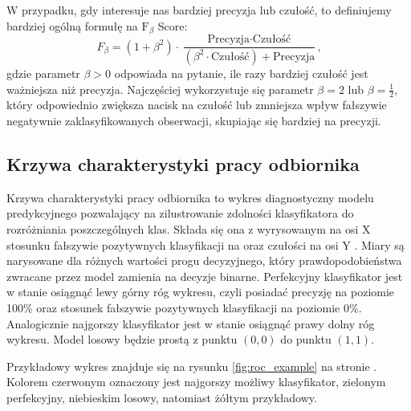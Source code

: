 \documentclass[inzynierska]{pwr_wmat_praca_dyplomowa}
\theoremstyle{plain}
\numberwithin{theorem}{chapter}
\theoremstyle{definition}
\numberwithin{theorem}{chapter}
\begin{document}
W przypadku, gdy interesuje nas bardziej precyzja lub czułość, to definiujemy bardziej ogólną formułę na $\text{F}_{\beta}$ Score:
$$ F_{\beta} = (1 + \beta^2) \cdot \frac{\text{Precyzja} \cdot \text{Czułość}}{(\beta^2 \cdot \text{Czułość}) + \text{Precyzja}} \text{,}$$
gdzie parametr $\beta>0$ odpowiada na pytanie, ile razy bardziej czułość jest ważniejsza niż precyzja. Najczęściej wykorzystuje się parametr $\beta = 2$ lub $\beta = \frac{1}{2}$, który odpowiednio zwiększa nacisk na czułość lub zmniejsza wpływ fałszywie negatywnie zaklasyfikowanych obserwacji, skupiając się bardziej na precyzji.


\subsection{Krzywa charakterystyki pracy odbiornika}
\label{ROC}

Krzywa charakterystyki pracy odbiornika to wykres diagnostyczny modelu predykcyjnego pozwalający na zilustrowanie zdolności klasyfikatora do rozróżniania poszczególnych klas. Składa się ona z wyrysowanym na osi X stosunku fałszywie pozytywnych klasyfikacji na oraz czułości na osi Y \cite{evaluation_metrics}. Miary są narysowane dla różnych wartości progu decyzyjnego, który prawdopodobieństwa zwracane przez model zamienia na decyzje binarne. Perfekcyjny klasyfikator jest w stanie osiągnąć lewy górny róg wykresu, czyli posiadać precyzję na poziomie 100\% oraz stosunek fałszywie pozytywnych klasyfikacji na poziomie 0\%. Analogicznie najgorszy klasyfikator jest w stanie osiągnąć prawy dolny róg wykresu. Model losowy będzie prostą z punktu $(0,0)$ do punktu $(1,1)$. 

Przykładowy wykres znajduje się na rysunku \ref{fig:roc_example} na stronie \pageref{fig:roc_example}. Kolorem czerwonym oznaczony jest najgorszy możliwy klasyfikator, zielonym perfekcyjny, niebieskim losowy, natomiast żółtym przykładowy.
\end{document}
